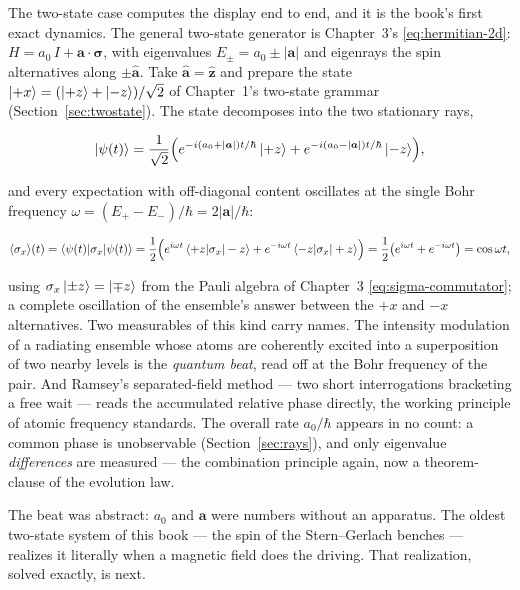 The two-state case computes the display end to end, and it is the book's first exact dynamics. The general two-state generator is Chapter~3's \eqref{eq:hermitian-2d}: $H = a_0\,I + \bm a\cdot\bm\sigma$, with eigenvalues $E_\pm = a_0 \pm |\bm a|$ and eigenrays the spin alternatives along $\pm\hat{\bm a}$. Take $\hat{\bm a} = \hat{\bm z}$ and prepare the state $\ket{+x} = (\ket{+z} + \ket{-z})/\sqrt{2}$ of Chapter~1's two-state grammar (Section~\ref{sec:twostate}). The state decomposes into the two stationary rays,
\begin{linenomath}
    \begin{equation*}
        \ket{\psi(t)} = \frac{1}{\sqrt{2}}\Bigl(e^{-i(a_0+|\bm a|)t/\hbar}\ket{+z} + e^{-i(a_0-|\bm a|)t/\hbar}\ket{-z}\Bigr),
    \end{equation*}
\end{linenomath}
and every expectation with off-diagonal content oscillates at the single Bohr frequency $\omega = (E_+ - E_-)/\hbar = 2|\bm a|/\hbar$:
\begin{linenomath}
    \begin{equation*}
        \langle\sigma_x\rangle(t)
        = \braket{\psi(t)|\sigma_x|\psi(t)}
        = \frac{1}{2}\Bigl(e^{i\omega t}\braket{+z|\sigma_x|-z} + e^{-i\omega t}\braket{-z|\sigma_x|+z}\Bigr)
        = \frac{1}{2}\bigl(e^{i\omega t} + e^{-i\omega t}\bigr)
        = \cos\omega t,
    \end{equation*}
\end{linenomath}
using $\sigma_x\ket{\pm z} = \ket{\mp z}$ from the Pauli algebra of Chapter~3 \eqref{eq:sigma-commutator}; a complete oscillation of the ensemble's answer between the $+x$ and $-x$ alternatives. Two measurables of this kind carry names. The intensity modulation of a radiating ensemble whose atoms are coherently excited into a superposition of two nearby levels is the \emph{quantum beat}, read off at the Bohr frequency of the pair. And Ramsey's separated-field method --- two short interrogations bracketing a free wait --- reads the accumulated relative phase directly, the working principle of atomic frequency standards. The overall rate $a_0/\hbar$ appears in no count: a common phase is unobservable (Section~\ref{sec:rays}), and only eigenvalue \emph{differences} are measured --- the combination principle again, now a theorem-clause of the evolution law.

The beat was abstract: $a_0$ and $\bm a$ were numbers without an apparatus. The oldest two-state system of this book --- the spin of the Stern--Gerlach benches --- realizes it literally when a magnetic field does the driving. That realization, solved exactly, is next.

